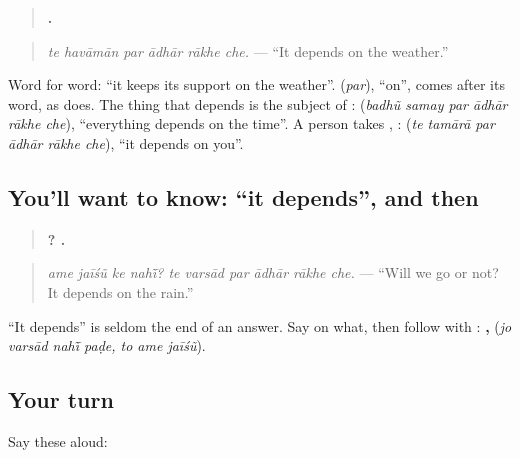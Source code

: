 \begin{grammarlens}[title={Grammar Lens: it keeps its support on …}]
\begin{quote}
\textbf{     .}
\end{quote}

\begin{quote}
\emph{te havāmān par ādhār rākhe che.} — \textquotedblleft{}It depends on the weather.\textquotedblright{}
\end{quote}

Word for word: \textquotedblleft{}it keeps its support on the weather\textquotedblright{}. \textbf{} (\emph{par}), \textquotedblleft{}on\textquotedblright{}, comes after its word, as \textbf{} does. The thing that depends is the subject of \textbf{ }: \textbf{     } (\emph{badhũ samay par ādhār rākhe che}), \textquotedblleft{}everything depends on the time\textquotedblright{}. A person takes \textbf{}, \textbf{}: \textbf{     } (\emph{te tamārā par ādhār rākhe che}), \textquotedblleft{}it depends on you\textquotedblright{}.
\end{grammarlens}

\subsection*{You'll want to know: \textquotedblleft{}it depends\textquotedblright{}, and then}
\begin{quote}
\textbf{   ?      .}
\end{quote}

\begin{quote}
\emph{ame jaīśũ ke nahī̃? te varsād par ādhār rākhe che.} — \textquotedblleft{}Will we go or not? It depends on the rain.\textquotedblright{}
\end{quote}

\textquotedblleft{}It depends\textquotedblright{} is seldom the end of an answer. Say on what, then follow with \textbf{}: \textbf{   ,   } (\emph{jo varsād nahī̃ paḍe, to ame jaīśũ}).

\subsection*{Your turn}
Say these aloud:

